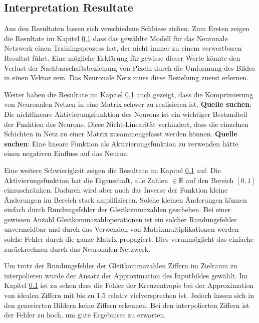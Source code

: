 \documentclass[Interploate_hadwritten_Digits.tex]{subfiles}
\begin{document}
	\subsection{Interpretation Resultate}
	Aus den Resultaten lassen sich verschiedene Schlüsse ziehen. Zum Ersten zeigen die Resultate im Kapitel \ref{} dass das gewählte Modell für das Neuronale Netzwerk einen Trainingsprozess hat, der nicht immer zu einem verwertbaren Resultat führt. Eine mögliche Erklärung für gewisse dieser Werte könnte den Verlust der Nachbarschaftsbeziehung von Pixeln durch die Umformung des Bildes in einen Vektor sein. Das Neuronale Netz muss diese Beziehung zuerst erlernen.
	
	Weiter haben die Resultate im Kapitel \ref{} auch gezeigt, dass die Komprimierung von Neuronalen Netzen in eine Matrix schwer zu realisieren ist. \textbf{Quelle suchen}: Die nichtlineare Aktivierungsfunktion des Neurons ist ein wichtiger Bestandteil der Funktion des Neurons. Diese Nicht-Linearität verhindert, dass die einzelnen Schichten in Netz zu einer Matrix zusammengefasst werden können. \textbf{Quelle suchen}: Eine lineare Funktion als Aktivierungsfunktion zu verwenden hätte einen negativen Einfluss auf das Neuron.
	
	Eine weitere Schwierigkeit zeigen die Resultate im Kapitel \ref{} auf. Die Aktivierungsfunktion hat die Eigenschaft, alle Zahlen $ \in \mathbb{R} $ auf den Bereich $ [0, 1] $ einzuschränken. Dadurch wird aber auch das Inverse der Funktion kleine Änderungen im Bereich stark amplifizieren. Solche kleinen Änderungen können einfach durch Rundungsfehler der Gleitkommazahlen geschehen. Bei einer gewissen Anzahl Gleitkommazahloperationen ist ein solcher Rundungsfehler unvermeidbar und durch das Verwenden von Matrixmultiplikationen werden solche Fehler durch die ganze Matrix propagiert. Dies verunmöglicht das einfache zurückrechnen durch das Neuronalen Netzwerk.
	
	Um trotz der Rundungsfehler der Gleitkommazahlen Ziffern im Zielraum zu interpolieren wurde der Ansatz der Approximation des Inputbildes gewählt. Im Kapitel \ref{} ist zu sehen dass die Fehler der Kreuzentropie bei der Approximation von idealen Ziffern mit bis zu 1.5 relativ vielversprechen ist. Jedoch lassen sich in den generierten Bildern keine Ziffern erkennen. Bei den interpolierten Ziffern ist der Fehler zu hoch, um gute Ergebnisse zu erwarten. 
	
\end{document}
